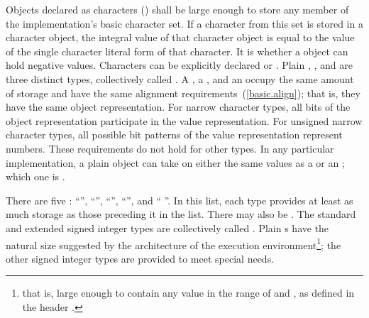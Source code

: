 \pnum
{}%
%
%
%
%
%
%
%
Objects declared as characters () shall be large enough to
store any member of the implementation's basic character set. If a
character from this set is stored in a character object, the integral
value of that character object is equal to the value of the single
character literal form of that character. It is 
whether a  object can hold negative values.
%
%
%
Characters can be explicitly declared  or
.
%
Plain , , and  are
three distinct types, collectively called .
A , a , and an
 occupy the same amount of storage and have the
same alignment requirements~(\ref{basic.align}); that is, they have the
same object representation. For narrow character types, all bits of the object
representation participate in the value representation. For unsigned narrow
character types, all possible bit patterns of the value representation
represent numbers. These requirements do not hold for other types. In
any particular implementation, a plain  object can take on
either the same values as a  or an ; which one is .

\pnum
{}%
%
There are five  :
%
%
%
%
%
``'', ``'', ``'',
``'', and ``  ''. In
this list, each type provides at least as much storage as those
preceding it in the list.
%
%
%
%
There may also be  . The standard and
extended signed integer types are collectively called .
%
Plain
s have the natural size suggested by the architecture of the
execution environment\footnote{that is, large enough to contain any value in the range of
 and , as defined in the header
.};
the other signed integer types are provided to meet special needs.


